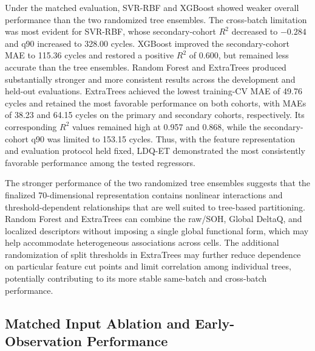 \documentclass[pdflatex,sn-mathphys-num]{sn-jnl}
\begin{document}
Under the matched evaluation, SVR-RBF and XGBoost showed weaker overall performance than the two randomized tree ensembles. The cross-batch limitation was most evident for SVR-RBF, whose secondary-cohort $R^2$ decreased to $-0.284$ and q90 increased to 328.00 cycles. XGBoost improved the secondary-cohort MAE to 115.36 cycles and restored a positive $R^2$ of 0.600, but remained less accurate than the tree ensembles. Random Forest and ExtraTrees produced substantially stronger and more consistent results across the development and held-out evaluations. ExtraTrees achieved the lowest training-CV MAE of 49.76 cycles and retained the most favorable performance on both cohorts, with MAEs of 38.23 and 64.15 cycles on the primary and secondary cohorts, respectively. Its corresponding $R^2$ values remained high at 0.957 and 0.868, while the secondary-cohort q90 was limited to 153.15 cycles. Thus, with the feature representation and evaluation protocol held fixed, LDQ-ET demonstrated the most consistently favorable performance among the tested regressors.

The stronger performance of the two randomized tree ensembles suggests that the finalized 70-dimensional representation contains nonlinear interactions and threshold-dependent relationships that are well suited to tree-based partitioning. Random Forest and ExtraTrees can combine the raw/SOH, Global DeltaQ, and localized descriptors without imposing a single global functional form, which may help accommodate heterogeneous associations across cells. The additional randomization of split thresholds in ExtraTrees may further reduce dependence on particular feature cut points and limit correlation among individual trees, potentially contributing to its more stable same-batch and cross-batch performance.

\FloatBarrier

\subsection{Matched Input Ablation and Early-Observation Performance}
\label{subsec:deep_comparison}

\end{document}
